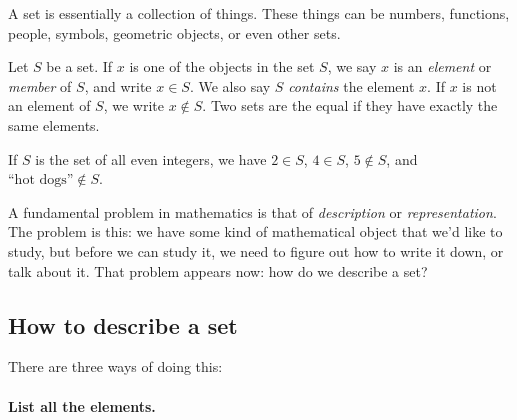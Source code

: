 \documentclass{tufte-book}
\begin{document}
A set is essentially a collection of things. These things can be numbers, functions, people, symbols, geometric objects, or even other sets. 

\begin{definition}
  Let $S$ be a set. If $x$ is one of the objects in the set $S$, we say $x$ is an \emph{element} or \emph{member} of $S$, and write $x \in S$. We also say $S$ \emph{contains} the element $x$. If $x$ is not an element of $S$, we write $x \notin S$. Two sets are the equal if they have exactly the same elements.
\end{definition}

If $S$ is the set of all even integers, we have $2 \in S$, $4 \in S$, $5 \notin S$, and $\text{``hot dogs''} \notin S$.

A fundamental problem in mathematics is that of \emph{description} or \emph{representation}. The problem is this: we have some kind of mathematical object that we'd like to study, but before we can study it, we need to figure out how to write it down, or talk about it. That problem appears now: how do we describe a set?

\subsection{How to describe a set}
\label{sec:how-describe-set}

There are three ways of doing this:

\paragraph{List all the elements.}
\label{sec:list-all-elements}
\end{document}
